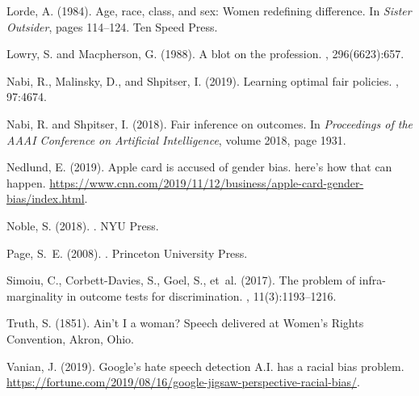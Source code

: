 \documentclass[11pt,dvipdfm]{article}
\begin{document}
\begin{thebibliography}{}
	Lorde, A. (1984).
	\newblock Age, race, class, and sex: Women redefining difference.
	\newblock In {\em Sister Outsider}, pages 114--124. Ten Speed Press.
	
	Lowry, S. and Macpherson, G. (1988).
	\newblock A blot on the profession.
	, 296(6623):657.
	
	Nabi, R., Malinsky, D., and Shpitser, I. (2019).
	\newblock Learning optimal fair policies.
	, 97:4674.
	
	Nabi, R. and Shpitser, I. (2018).
	\newblock Fair inference on outcomes.
	\newblock In {\em Proceedings of the AAAI Conference on Artificial
		Intelligence}, volume 2018, page 1931.
	
	Nedlund, E. (2019).
	\newblock Apple card is accused of gender bias. here's how that can happen.
	\url{https://www.cnn.com/2019/11/12/business/apple-card-gender-bias/index.html}.
	
	Noble, S. (2018).
	.
	\newblock NYU Press.
	
	Page, S.~E. (2008).
	.
	\newblock Princeton University Press.
	
	Simoiu, C., Corbett-Davies, S., Goel, S., et~al. (2017).
	\newblock The problem of infra-marginality in outcome tests for discrimination.
	, 11(3):1193--1216.
	
	Truth, S. (1851).
	\newblock Ain't {I} a woman?
	\newblock Speech delivered at Women's Rights Convention, Akron, Ohio.
	
	Vanian, J. (2019).
	\newblock Google’s hate speech detection {A.I.} has a racial bias problem.
	\url{https://fortune.com/2019/08/16/google-jigsaw-perspective-racial-bias/}.
	

\end{thebibliography}
\end{document}
